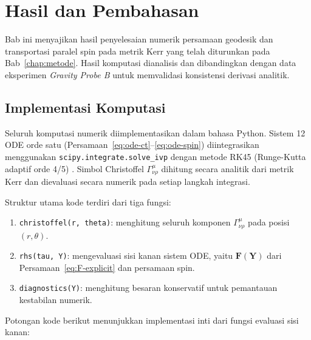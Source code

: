 
\chapter{Hasil dan Pembahasan}
\label{chap:hasil}

Bab ini menyajikan hasil penyelesaian numerik
persamaan geodesik dan transportasi paralel spin pada metrik Kerr
yang telah diturunkan pada Bab~\ref{chap:metode}.
Hasil komputasi dianalisis dan dibandingkan dengan
data eksperimen \textit{Gravity Probe B}
untuk memvalidasi konsistensi derivasi analitik.


\section{Implementasi Komputasi}
\label{sec:implementasi}

Seluruh komputasi numerik diimplementasikan dalam bahasa Python.
Sistem 12 ODE orde satu (Persamaan~\ref{eq:ode-ct}--\ref{eq:ode-spin})
diintegrasikan menggunakan \texttt{scipy.integrate.solve\_ivp}
dengan metode RK45 (Runge-Kutta adaptif orde 4/5)
\parencite{SciPy2020}.
Simbol Christoffel $\Gamma^\mu_{\nu\rho}$ dihitung secara analitik
dari metrik Kerr dan dievaluasi secara numerik pada setiap langkah integrasi.

Struktur utama kode terdiri dari tiga fungsi:
\begin{enumerate}
    \item \texttt{christoffel(r, theta)}: menghitung seluruh komponen
          $\Gamma^\mu_{\nu\rho}$ pada posisi $(r, \theta)$.
    \item \texttt{rhs(tau, Y)}: mengevaluasi sisi kanan sistem ODE,
          yaitu $\mathbf{F}(\mathbf{Y})$ dari Persamaan~\eqref{eq:F-explicit}
          dan persamaan spin.
    \item \texttt{diagnostics(Y)}: menghitung besaran konservatif
          untuk pemantauan kestabilan numerik.
\end{enumerate}

Potongan kode berikut menunjukkan implementasi inti
dari fungsi evaluasi sisi kanan:


